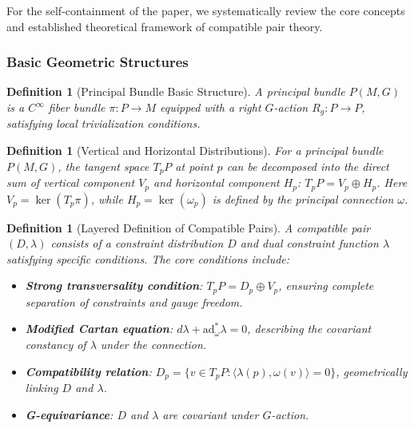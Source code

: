 \documentclass[a4paper,12pt]{extarticle}
\theoremstyle{plain}
\newtheorem{definition}[theorem]{Definition}
\theoremstyle{definition}
\begin{document}
For the self-containment of the paper, we systematically review the core concepts and established theoretical framework of compatible pair theory.

\subsubsection{Basic Geometric Structures}

\begin{definition}[Principal Bundle Basic Structure]
\label{def:principal-bundle}
A principal bundle $P(M,G)$ is a $C^\infty$ fiber bundle $\pi: P \to M$ equipped with a right $G$-action $R_g: P \to P$, satisfying local trivialization conditions.
\end{definition}

\begin{definition}[Vertical and Horizontal Distributions]
\label{def:vertical-horizontal}
For a principal bundle $P(M,G)$, the tangent space $T_pP$ at point $p$ can be decomposed into the direct sum of vertical component $V_p$ and horizontal component $H_p$: $T_pP = V_p \oplus H_p$. Here $V_p = \ker(T_p\pi)$, while $H_p = \ker(\omega_p)$ is defined by the principal connection $\omega$.
\end{definition}

\begin{definition}[Layered Definition of Compatible Pairs]
\label{def:compatible-pair-detailed}
A compatible pair $(D, \lambda)$ consists of a constraint distribution $D$ and dual constraint function $\lambda$ satisfying specific conditions. The core conditions include:
\begin{itemize}
    \item \textbf{Strong transversality condition}: $T_pP = D_p \oplus V_p$, ensuring complete separation of constraints and gauge freedom.
    \item \textbf{Modified Cartan equation}: $d\lambda + \mathrm{ad}^*_\omega \lambda = 0$, describing the covariant constancy of $\lambda$ under the connection.
    \item \textbf{Compatibility relation}: $D_p = \{v \in T_pP : \langle\lambda(p), \omega(v)\rangle = 0\}$, geometrically linking $D$ and $\lambda$.
    \item \textbf{G-equivariance}: $D$ and $\lambda$ are covariant under $G$-action.
\end{itemize}
\end{definition}

\end{document}
